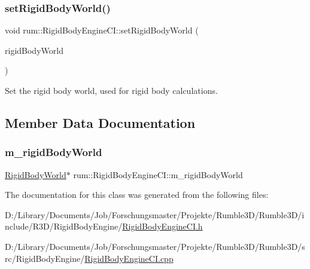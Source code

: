 \subsubsection{\texorpdfstring{set\+Rigid\+Body\+World()}{setRigidBodyWorld()}}
{\footnotesize\ttfamily void rum\+::\+Rigid\+Body\+Engine\+C\+I\+::set\+Rigid\+Body\+World (\begin{DoxyParamCaption}\item[{\mbox{\hyperlink{classrum_1_1_rigid_body_world}{Rigid\+Body\+World}} $\ast$}]{rigid\+Body\+World }\end{DoxyParamCaption})}

Set the rigid body world, used for rigid body calculations. 

\subsection{Member Data Documentation}
\mbox{\label{classrum_1_1_rigid_body_engine_c_i_a10e40ea94b4a4f849e5f7e403d9b6966}} 
\subsubsection{\texorpdfstring{m\+\_\+rigid\+Body\+World}{m\_rigidBodyWorld}}
{\footnotesize\ttfamily \mbox{\hyperlink{classrum_1_1_rigid_body_world}{Rigid\+Body\+World}}$\ast$ rum\+::\+Rigid\+Body\+Engine\+C\+I\+::m\+\_\+rigid\+Body\+World\hspace{0.3cm}{\ttfamily [protected]}}



The documentation for this class was generated from the following files\+:\begin{DoxyCompactItemize}
\item 
D\+:/\+Library/\+Documents/\+Job/\+Forschungsmaster/\+Projekte/\+Rumble3\+D/\+Rumble3\+D/include/\+R3\+D/\+Rigid\+Body\+Engine/\mbox{\hyperlink{_rigid_body_engine_c_i_8h}{Rigid\+Body\+Engine\+C\+I.\+h}}\item 
D\+:/\+Library/\+Documents/\+Job/\+Forschungsmaster/\+Projekte/\+Rumble3\+D/\+Rumble3\+D/src/\+Rigid\+Body\+Engine/\mbox{\hyperlink{_rigid_body_engine_c_i_8cpp}{Rigid\+Body\+Engine\+C\+I.\+cpp}}\end{DoxyCompactItemize}
